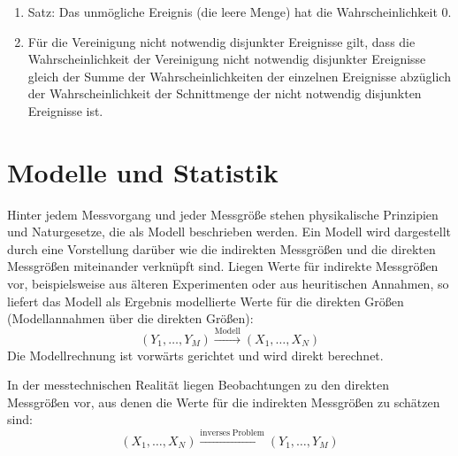 \begin{raggedright}
\begin{enumerate}
\begin{itemize}
\begin{enumerate}
		Anmerkung zum Begriff \textbf{komplementär}: Das Komplement $\bar A$ zu einer Menge $A$ bezüglich des
		Grundbereichs $G$ ist die Menge aller Elemente aus $G$, die nicht Elemente von $A$ sind.
		$A$ und $\bar A$ sind Komplementärmengen bezüglich $G$.
		(Die Vereinigungsmenge von $A$ und $\bar A$ ist dann $G$ und die Schnittmenge ist die leere Menge).
	\item Satz: Das unmögliche Ereignis (die leere Menge) hat die Wahrscheinlichkeit 0.
	\item Für die Vereinigung nicht notwendig disjunkter Ereignisse gilt, dass die
		Wahrscheinlichkeit der Vereinigung nicht notwendig disjunkter Ereignisse gleich der
		Summe der Wahrscheinlichkeiten der einzelnen Ereignisse abzüglich der
		Wahrscheinlichkeit der Schnittmenge der nicht notwendig disjunkten Ereignisse ist.
	\end{enumerate}
\end{itemize}

\end{enumerate}
\end{raggedright}

\section{Modelle und Statistik}
\label{ModelleStatistik}

Hinter jedem Messvorgang und jeder Messgröße stehen physikalische Prinzipien und Naturgesetze, die
als Modell beschrieben werden. Ein Modell wird dargestellt durch eine Vorstellung darüber wie die
indirekten Messgrößen und die direkten Messgrößen miteinander verknüpft sind. Liegen Werte für indirekte
Messgrößen vor, beispielsweise aus älteren Experimenten oder aus heuritischen Annahmen, so liefert
das Modell als Ergebnis modellierte Werte für die direkten Größen (Modellannahmen über die direkten Größen):
\begin{equation}
(Y_1, \dots, Y_M) \xrightarrow{\mathrm{Modell}} (X_1, \dots, X_N)
\label{forwardModel}
\end{equation}
Die Modellrechnung ist vorwärts gerichtet und wird direkt berechnet.

In der messtechnischen Realität liegen Beobachtungen zu den direkten Messgrößen vor, aus denen die Werte für die
indirekten Messgrößen zu schätzen sind:
\begin{equation}
(X_1, \dots, X_N) \xrightarrow{\mathrm{inverses \; Problem}} (Y_1, \dots, Y_M)
\label{inverseProblem}
\end{equation}

